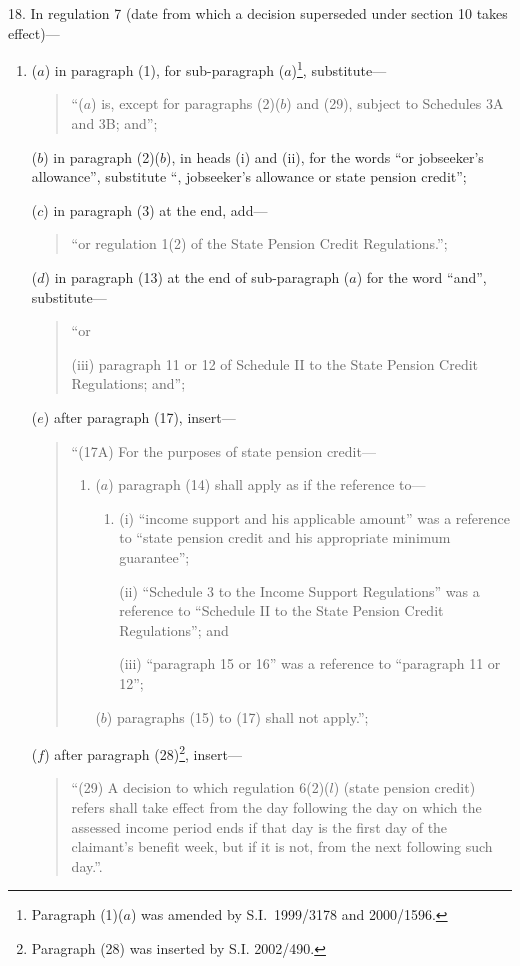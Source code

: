 \documentclass[12pt,a4paper]{article}
\begin{document}
18.  In regulation 7 (date from which a decision superseded under section 10 takes effect)—
\begin{enumerate}\item[]
($a$) in paragraph (1), for sub-paragraph ($a$)\footnote{Paragraph (1)($a$) was amended by S.I.\ 1999/3178 and 2000/1596.}, substitute—
\begin{quotation}
“($a$) is, except for paragraphs (2)($b$)  and (29), subject to Schedules 3A and 3B; and”;
\end{quotation}

($b$) in paragraph (2)($b$), in heads (i)  and (ii), for the words “or jobseeker’s allowance”, substitute “, jobseeker’s allowance or state pension credit”;

($c$) in paragraph (3) at the end, add—
\begin{quotation}
    “or regulation 1(2) of the State Pension Credit Regulations.”; 
\end{quotation}

($d$) in paragraph (13) at the end of sub-paragraph ($a$)  for the word “and”, substitute—
\begin{quotation}
    “or

    (iii) 
    paragraph 11 or 12 of Schedule II to the State Pension Credit Regulations; and”; 
\end{quotation}

($e$) after paragraph (17), insert—
\begin{quotation}
“(17A) For the purposes of state pension credit—
\begin{enumerate}\item[]
($a$) paragraph (14) shall apply as if the reference to—
\begin{enumerate}\item[]
(i) “income support and his applicable amount” was a reference to “state pension credit and his appropriate minimum guarantee”;

(ii) “Schedule 3 to the Income Support Regulations” was a reference to “Schedule II to the State Pension Credit Regulations”; and

(iii) “paragraph 15 or 16” was a reference to “paragraph 11 or 12”;
\end{enumerate}

($b$) paragraphs (15) to (17) shall not apply.”;
\end{enumerate}
\end{quotation}

($f$) after paragraph (28)\footnote{Paragraph (28) was inserted by S.I. 2002/490.}, insert—
\begin{quotation}
“(29) A decision to which regulation 6(2)($l$) (state pension credit) refers shall take effect from the day following the day on which the assessed income period ends if that day is the first day of the claimant’s benefit week, but if it is not, from the next following such day.”.
\end{quotation}
\end{enumerate}
\end{document}
